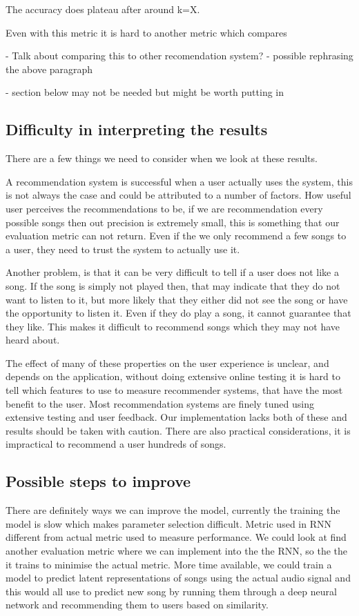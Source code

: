 \documentclass{article} %
\begin{document}
The accuracy does plateau after around k=X.  

Even with this metric it is hard to another metric which compares 

 - Talk about comparing this to other recomendation system?
 - possible rephrasing the above paragraph


- section below may not be needed but might be worth putting in

\subsection{Difficulty in interpreting the results}
There are a few things we need to consider when we look at these results. 

A recommendation system is successful when a user actually uses the system, this is not always the case and could be attributed to a number of factors. How useful user perceives the recommendations to be, if we are recommendation every possible songs then out precision is extremely small, this is something that our evaluation metric can not return. Even if the we only recommend a few songs to a user, they need to trust the system to actually use it. 

Another problem, is that it can be very difficult to tell if a user does not like a song. If the song is simply not played then, that may indicate that they do not want to listen to it, but more likely that they either did not see the song or have the opportunity to listen it. Even if they do play a song, it cannot guarantee that they like. This makes it difficult to recommend songs which they may not have heard about. \cite{Evaluation}

The effect of many of these properties on the user experience is unclear, and depends on the application, without doing extensive online testing it is hard to tell which features to use to measure recommender systems, that have the most benefit to the user. Most recommendation systems are finely tuned using extensive testing and user feedback. Our implementation lacks both of these and results should be taken with caution. There are also practical considerations, it is impractical to recommend a user hundreds of songs.

\subsection{Possible steps to improve}
There are definitely ways we can improve the model, currently the training the model is slow which makes parameter selection difficult. Metric used in RNN different from actual metric used to measure performance. We could look at find another evaluation metric where we can implement into the the RNN, so the the it trains to minimise the actual metric. More time available, we could train a model to predict latent representations of songs using the actual audio signal and this would all use to predict new song by running them through a deep neural network and recommending them to users based on similarity.
\end{document}
